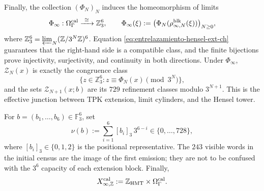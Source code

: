Finally, the collection \((\Phi_N)_N\) induces the homeomorphism of limits
\begin{equation}
 \Phi_\infty:\Omega_\Gamma^{\rm cal}
 \xrightarrow{\ \cong\ }\mathbb Z_3^6,\qquad
 \Phi_\infty(\xi):=
 \bigl(\Phi_N(\rho^{\rm blk}_{\infty,N}(\xi))\bigr)_{N\ge0},
 \label{eq:phi-infinito-hensel-ext-ch}
\end{equation}
where
\(\mathbb Z_3^6=\varprojlim_N(\mathbb Z/3^N\mathbb Z)^6\).
Equation \eqref{eq:entrelazamiento-hensel-ext-ch} guarantees that the
right-hand side is a compatible class, and the finite bijections prove
injectivity, surjectivity, and continuity in both directions. Under
\(\Phi_\infty\), \(\mathscr Z_N(x)\) is exactly the congruence class
\[
 \{z\in\mathbb Z_3^6:z\equiv\Phi_N(x)\pmod{3^N}\},
\]
and the sets \(\mathscr Z_{N+1}(x;b)\) are its \(729\) refinement classes
modulo \(3^{N+1}\). This is the effective junction between TPK extension,
limit cylinders, and the Hensel tower.

For \(b=(b_1,\ldots,b_6)\in\mathbb F_3^6\), set
\[
 \nu(b):=\sum_{i=1}^{6}[b_i]_3\,3^{6-i}
 \in\{0,\ldots,728\},
\tag{40c$_0$}
\label{eq:valor-bloque-ch}
\]
where \([b_i]_3\in\{0,1,2\}\) is the positional representative. The
\(243\) visible words in the initial census are the image of the first
emission; they are not to be confused with the \(3^6\) capacity of each
extension block. Finally,
\[
 X_{\infty,\mathbb Z}^{\rm cal}
 :=\mathbb Z_{\rm HMT}\times\Omega_\Gamma^{\rm cal}.
\]
